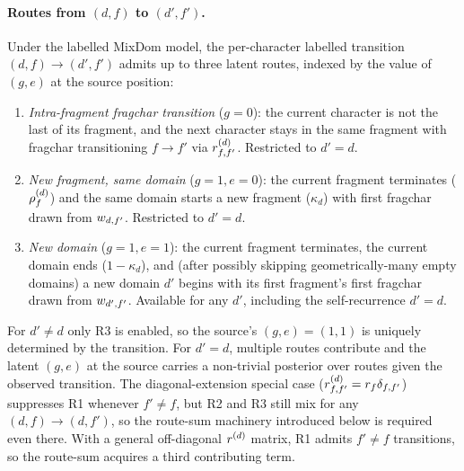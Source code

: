 \paragraph{Routes from $(d, f)$ to $(d', f')$.}
Under the labelled MixDom model, the per-character labelled
transition $(d, f) \to (d', f')$ admits up to three latent routes,
indexed by the value of $(g, e)$ at the source position:
\begin{enumerate}[nosep, label=R\arabic*.]
\item \emph{Intra-fragment fragchar transition} ($g = 0$): the
current character is not the last of its fragment, and the next
character stays in the same fragment with fragchar transitioning
$f \to f'$ via $r^{(d)}_{f, f'}$. Restricted to $d' = d$.
\item \emph{New fragment, same domain} ($g = 1, e = 0$): the
current fragment terminates ($\rho^{(d)}_f$) and the same domain
starts a new fragment ($\kappa_d$) with first fragchar drawn from
$w_{d, f'}$. Restricted to $d' = d$.
\item \emph{New domain} ($g = 1, e = 1$): the current fragment
terminates, the current domain ends ($1{-}\kappa_d$), and (after
possibly skipping geometrically-many empty domains) a new domain
$d'$ begins with its first fragment's first fragchar drawn from
$w_{d', f'}$. Available for any $d'$, including the
self-recurrence $d' = d$.
\end{enumerate}

For $d' \neq d$ only R3 is enabled, so the source's $(g, e) = (1, 1)$
is uniquely determined by the transition. For $d' = d$, multiple
routes contribute and the latent $(g, e)$ at the source carries a
non-trivial posterior over routes given the observed transition.
The diagonal-extension special case ($r^{(d)}_{f, f'} = r_f
\delta_{f, f'}$) suppresses R1 whenever $f' \neq f$, but R2 and R3
still mix for any $(d, f) \to (d, f')$, so the route-sum machinery
introduced below is required even there. With a general off-diagonal
$r^{(d)}$ matrix, R1 admits $f' \neq f$ transitions, so
the route-sum acquires a third contributing term.

